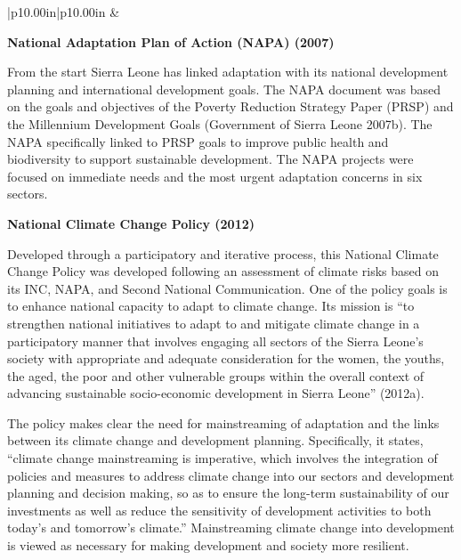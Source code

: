 \documentclass[
]{book}
\begin{document}
\begin{longtable}[r]{|p{10.00in}|p{10.00in}}
 &  \\



\end{longtable}

\textbf{National Adaptation Plan of Action (NAPA) (2007)}

From the start Sierra Leone has linked adaptation with its national development planning and international development goals. The NAPA document was based on the goals and objectives of the Poverty Reduction Strategy Paper (PRSP) and the Millennium Development Goals (Government of Sierra Leone 2007b). The NAPA specifically linked to PRSP goals to improve public health and biodiversity to support sustainable development. The NAPA projects were focused on immediate needs and the most urgent adaptation concerns in six sectors.

\textbf{National Climate Change Policy (2012)}

Developed through a participatory and iterative process, this National Climate Change Policy was developed following an assessment of climate risks based on its INC, NAPA, and Second National Communication. One of the policy goals is to enhance national capacity to adapt to climate change. Its mission is ``to strengthen national initiatives to adapt to and mitigate climate change in a participatory manner that involves engaging all sectors of the Sierra Leone's society with appropriate and adequate consideration for the women, the youths, the aged, the poor and other vulnerable groups within the overall context of advancing sustainable socio-economic development in Sierra Leone'' (2012a).

The policy makes clear the need for mainstreaming of adaptation and the links between its climate change and development planning. Specifically, it states, ``climate change mainstreaming is imperative, which involves the integration of policies and measures to address climate change into our sectors and development planning and decision making, so as to ensure the long-term sustainability of our investments as well as reduce the sensitivity of development activities to both today's and tomorrow's climate.'' Mainstreaming climate change into development is viewed as necessary for making development and society more resilient.
\end{document}

